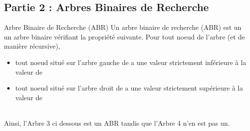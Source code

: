 \documentclass[11pt,a4paper,french,twoside]{PMCours}
\begin{document}
\subsection*{Partie 2 : Arbres Binaires de Recherche}
\begin{Definition}{Arbre Binaire de Recherche (ABR)}
Un arbre binaire de recherche (ABR) est un un arbre binaire vérifiant la propriété suivante.
Pour tout noeud  de l'arbre (et de manière récursive), 
\begin{itemize}
\item tout noeud situé sur l'arbre gauche de  a une valeur 
strictement inférieure à la valeur de 
\item tout noeud situé sur l'arbre droit de  a une valeur strictement supérieure à la valeur de 
\end{itemize}
\end{Definition}\ \\
Ainsi, l'Arbre 3 ci dessous est un ABR tandis que l'Arbre 4 n'en est pas un. 
\end{document}

